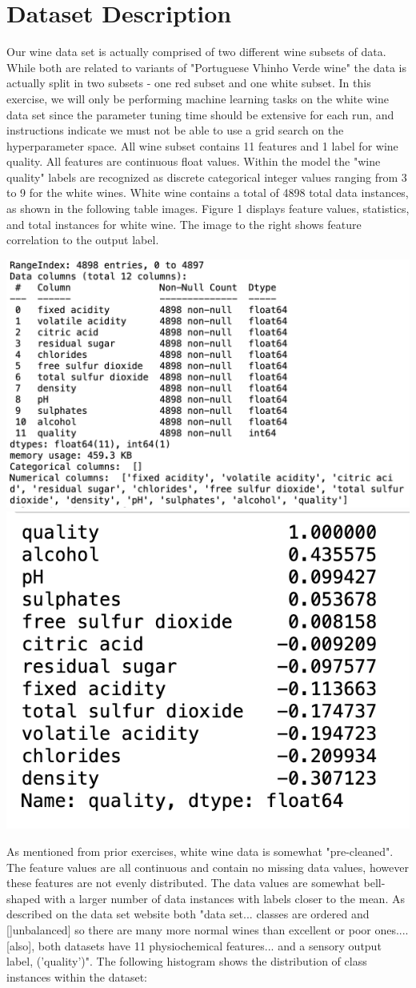 \documentclass[titlepage]{article}
\begin{document}
	\section*{Dataset Description}
	Our wine data set is actually comprised of two different wine subsets of data.  While both are related to variants of \cite{dataset} "Portuguese Vhinho Verde wine" the data is actually split in two subsets - one red subset and one white subset.  In this exercise, we will only be performing machine learning tasks on the white wine data set since the parameter tuning time should be extensive for each run, and instructions indicate we must not be able to use a grid search on the hyperparameter space.  All wine subset contains 11 features and 1 label for wine quality.   All features are continuous float values.  Within the model the "wine quality" labels are recognized as discrete categorical integer values ranging from 3 to 9 for the white wines.  White wine contains a total of 4898 total data instances, as shown in the following table images. Figure 1 displays feature values, statistics, and total instances for white wine.  The image to the right shows feature correlation to the output label.  
	
	\begin{center}
		\includegraphics[width=.55\textwidth]{img/white.png}
		\includegraphics[width=.405\textwidth]{img/ww_feature_correlation.png}
	\end{center}

	\noindent As mentioned from prior exercises, white wine data is somewhat "pre-cleaned".   The feature values are all continuous and contain no missing data values, however these features are not evenly distributed.  The data values are somewhat bell-shaped with a larger number of data instances with labels closer to the mean.  As described on the data set website \cite{dataset} both "data set... classes are ordered and []unbalanced] so there are many more normal wines than excellent or poor ones.... [also], both datasets have 11 physiochemical features... and a sensory output label, ('quality')".   The following histogram shows the distribution of class instances within the dataset:  
	
\end{document}
